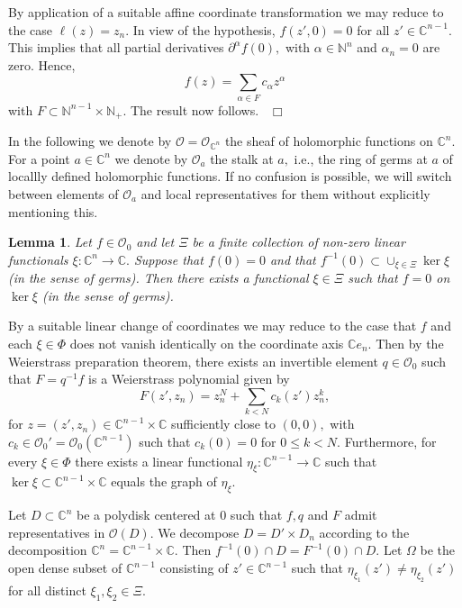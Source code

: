 \documentclass[12pt,a4paper]{article}
\newtheorem{Lemma}[Thm]{Lemma}
\newenvironment{lemma}[0]{\begin{Lemma}\noindent}%
{\end{Lemma}}
\def\proof{\par\noindent{\it Proof.}{\ }{\ }}
\def\qed{~\hfill\hbox{$\Box$}\medbreak}
\def\msy#1{{\mathbb #1}}
\def\C{{\msy C}}
\def\N{{\msy N}}
\def\ga{\alpha}
\def\to{\rightarrow}
\def\cO{{\mathcal O}}
\numberwithin{Thm}{section}
\numberwithin{equation}{section}
\numberwithin{equation}{section}
\begin{document}
\proof 
By application of a suitable 
affine coordinate transformation we may reduce to the case $\ell (z) = z_n.$ In view of  the hypothesis, $f(z' , 0) = 0$ for all $z' \in \C^{n-1}.$ This implies that all partial derivatives
$\partial^\ga f(0),$ with $\ga \in \N^{n}$ and $\ga_n =0$ are zero. Hence, 
$$ 
f(z) = \sum_{\ga\in F} c_\ga z^\ga
$$%
with $F \subset \N^{n-1} \times \N_+.$  The result now follows.
\qed

In the following we denote by $\cO = \cO_{\C^n}$ the sheaf of holomorphic functions
on $\C^n.$ For a point $a\in \C^n$ we denote by $\cO_a$ the stalk at $a,$ i.e., the ring of germs
at $a$ of locallly defined holomorphic functions. If no confusion is possible, we will switch 
between elements of $\cO_a$ and local representatives for them without explicitly mentioning this.

\begin{lemma}
\label{l: linear factor lemma}
Let $f \in \cO_0$ and let $\Xi$ be a finite collection of non-zero linear functionals $\xi: \C^n \to \C.$ 
Suppose that $f(0) = 0$ and that $f^{-1}(0) \subset \cup_{\xi \in \Xi}\ker \xi$ (in the sense of germs).
Then there exists a functional $\xi \in \Xi$ such that $f = 0$ on $\ker \xi$ (in the sense of germs). 
\end{lemma} 

\proof 
By a suitable linear change of coordinates we may reduce to the case that 
$f$ and each $\xi \in \Phi$ does not vanish identically on the coordinate axis $\C e_n.$ 
Then by the Weierstrass preparation theorem, there exists an invertible element $q \in \cO_0$ 
such that $F= q^{-1}f$ is a Weierstrass polynomial given by 
\begin{equation}
\label{e: f in z n}
F(z', z_n) = z_n^N + \sum_{k < N} c_k(z') z_n^k , 
\end{equation} 
for $z = (z', z_n) \in \C^{n-1}\times \C$ sufficiently close to $(0,0),$ 
with $c_k \in \cO_0' = \cO_0(\C^{n-1})$ such that $c_k(0) = 0$ for $0\leq k < N.$ 
Furthermore, for every $\xi \in \Phi$ there exists a linear functional
$\eta_\xi: \C^{n-1} \to \C$ such that $\ker \xi \subset \C^{n-1}\times \C$ equals 
the graph of $\eta_\xi.$

Let $D\subset \C^n$ be a polydisk centered at $0$ such that $f, q$ and $F$ admit representatives
in $\cO(D).$ We decompose $D = D' \times D_n$ according to the decomposition $\C^n = \C^{n-1} 
\times \C.$ Then $f^{-1}(0) \cap D = F^{-1}(0)\cap D.$ 
Let $\Omega$ be the open dense subset of $\C^{n-1}$ consisting of $z' \in \C^{n-1}$ 
such that $\eta_{\xi_1}(z') \neq \eta_{\xi_2}(z')$ for all distinct $\xi_1, \xi_2 \in \Xi.$ 
\end{document}
